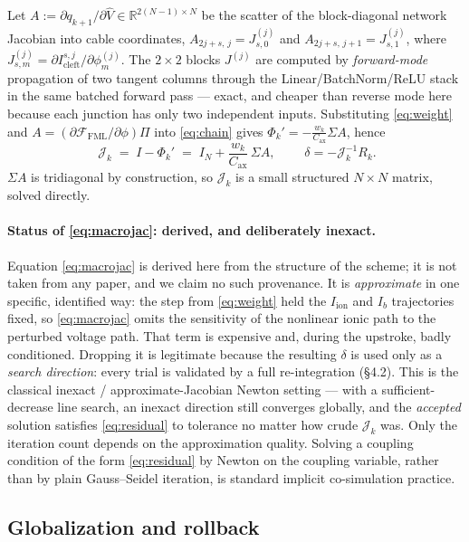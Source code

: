 \documentclass[11pt]{article}
\newcommand{\Icl}{I_{\mathrm{cleft}}}
\newcommand{\Iion}{I_{\mathrm{ion}}}
\newcommand{\Ib}{I_{b}}
\newcommand{\Cax}{C_{\mathrm{ax}}}
\newcommand{\FML}{\mathcal{F}_{\mathrm{FML}}}
\newcommand{\Rn}{\mathbb{R}}
\begin{document}
Let $A:=\partial q_{k+1}/\partial\widehat V\in\Rn^{2(N-1)\times N}$ be the
scatter of the block-diagonal network Jacobian into cable coordinates,
$A_{2j+s,\,j}=J^{(j)}_{s,0}$ and $A_{2j+s,\,j+1}=J^{(j)}_{s,1}$, where
$J^{(j)}_{s,m}=\partial\Icl^{s,j}/\partial\phi^{(j)}_m$. The $2\times2$ blocks
$J^{(j)}$ are computed by \emph{forward-mode} propagation of two tangent columns
through the Linear/BatchNorm/ReLU stack in the same batched forward pass
 --- exact, and cheaper than reverse mode here because each
junction has only two independent inputs. Substituting \eqref{eq:weight} and
$A=(\partial\FML/\partial\phi)\Pi$ into \eqref{eq:chain} gives
$\Phi_k'=-\tfrac{w_k}{\Cax}\Sigma A$, hence
\begin{equation}
\boxed{\;
\mathcal J_k \;=\; I-\Phi_k' \;=\; I_N+\frac{w_k}{\Cax}\,\Sigma A,
\;}
\qquad \delta=-\mathcal J_k^{-1}R_k.
\label{eq:macrojac}
\end{equation}
$\Sigma A$ is tridiagonal by construction, so $\mathcal J_k$ is a small
structured $N\times N$ matrix, solved directly.

\paragraph{Status of \eqref{eq:macrojac}: derived, and deliberately inexact.}
Equation \eqref{eq:macrojac} is derived here from the structure of the scheme; it
is not taken from any paper, and we claim no such provenance. It is
\emph{approximate} in one specific, identified way: the step from
\eqref{eq:weight} held the $\Iion$ and $\Ib$ trajectories fixed, so
\eqref{eq:macrojac} omits the sensitivity of the nonlinear ionic path to the
perturbed voltage path. That term is expensive and, during the upstroke, badly
conditioned. Dropping it is legitimate because the resulting $\delta$ is used
only as a \emph{search direction}: every trial is validated by a full
re-integration (\S4.2). This is the classical inexact / approximate-Jacobian
Newton setting --- with a
sufficient-decrease line search, an inexact direction still converges globally,
and the \emph{accepted} solution satisfies \eqref{eq:residual} to tolerance no
matter how crude $\mathcal J_k$ was. Only the iteration count depends on the
approximation quality. Solving a coupling condition of the form
\eqref{eq:residual} by Newton on the coupling variable, rather than by plain
Gauss--Seidel iteration, is standard implicit co-simulation practice.

\subsection{Globalization and rollback}
\end{document}
